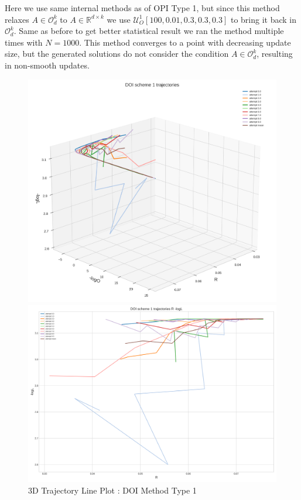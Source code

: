Here we use same internal methods as of OPI Type 1, but since this method relaxes $A\in \mathcal{O}^{k}_{d}$ to $A\in \mathbb{R}^{d\times k}$ we use $\mathcal{U}^{1}_{O}[100,0.01,0.3,0.3,0.3]$ to bring it back in $\mathcal{O}^{k}_{d}$. Same as before to get better statistical result we ran the method multiple times with $N=1000$. This method converges to a point with decreasing update size, but the generated solutions do not consider the condition $A\in \mathcal{O}^{k}_{d}$, resulting in non-smooth updates.
\begin{figure}[H]
    \centering
    \begin{minipage}[t]{0.45\textwidth}
        \centering
        \includegraphics[width=\textwidth]{images/1-DOI scheme 1 mean trajectory.png}
        \captionsetup{font=tiny}
        \caption{3D Trajectory Line Plot : DOI Method Type 1}
        \label{fig:cumulative_returns}
    \end{minipage}%
    \begin{minipage}[t]{0.5511\textwidth}
        \centering
        \includegraphics[width=\textwidth]{images/DOI scheme 1 trajectories R -logL.png}

\end{minipage}
\end{figure}
